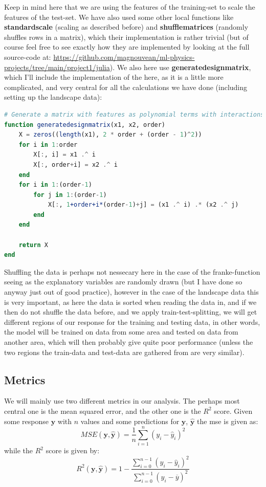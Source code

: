 \documentclass{article}
\begin{document}
Keep in mind here that we are using the features of the training-set to scale
the features of the test-set. We have also used some other local functions like
\textbf{standardscale} (scaling as described before) and
\textbf{shufflematrices} (randomly shuffles rows in a matrix), which their
implementation is rather trivial (but of course feel free to see exactly how
they are implemented by looking at the full source-code at:
\url{https://github.com/magnouvean/ml-physics-projects/tree/main/project1/julia}).
We also here use \textbf{generatedesignmatrix}, which I'll include the
implementation of the here, as it is a little more complicated, and very central
for all the calculations we have done (including setting up the landscape data):
\begin{lstlisting}[language=julia]
# Generate a matrix with features as polynomial terms with interactions
function generatedesignmatrix(x1, x2, order)
    X = zeros((length(x1), 2 * order + (order - 1)^2))
    for i in 1:order
        X[:, i] = x1 .^ i
        X[:, order+i] = x2 .^ i
    end
    for i in 1:(order-1)
        for j in 1:(order-1)
            X[:, 1+order+i*(order-1)+j] = (x1 .^ i) .* (x2 .^ j)
        end
    end

    return X
end
\end{lstlisting}

Shuffling the data is perhaps not nessecary here in the case of the
franke-function seeing as the explanatory variables are randomly drawn (but I
have done so anyway just out of good practice), however in the case of the
landscape data this is very important, as here the data is sorted when reading
the data in, and if we then do not shuffle the data before, and we apply
train-test-splitting, we will get different regions of our response for the
training and testing data, in other words, the model will be trained on data
from some area and tested on data from another area, which will then probably
give quite poor performance (unless the two regions the train-data and test-data
are gathered from are very similar).

\subsection{Metrics}
We will mainly use two different metrics in our analysis. The perhaps most
central one is the mean squared error, and the other one is the $R^2$ score.
Given some response $\mathbf{y}$ with $n$ values and some predictions for
$\mathbf{y}$, $\hat{\mathbf{y}}$ the mse is given as: \cite{week34notes}
$$MSE(\mathbf{y}, \hat{\mathbf{y}}) = \frac{1}{n} \sum_{i=1}^n (y_i - \hat{y}_i)^2$$
while the $R^2$ score is given by: \cite{week34notes}
$$R^2(\mathbf{y}, \hat{\mathbf{y}}) = 1 - \frac{\sum_{i=0}^{n-1} (y_i - \hat{y}_i)^2}{\sum_{i=0}^{n-1}(y_i - \overline{y})^2}$$
\end{document}

